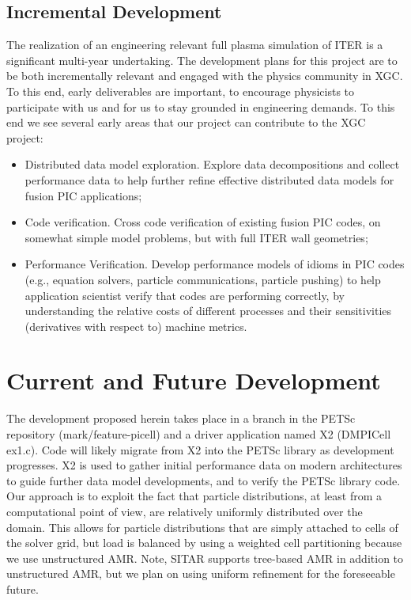\documentclass[review]{siamart}
\begin{document}
\subsection{Incremental Development}
\label{sec:id}

The realization of an engineering relevant full plasma simulation of ITER is a significant multi-year undertaking.
The development plans for this project are to be both incrementally relevant and engaged with the physics community in XGC.
To this end, early deliverables are important, to encourage physicists to participate with us and for us to stay grounded in engineering demands.
To this end we see several early areas that our project can contribute to the XGC project:
\begin{itemize}
\item Distributed data model exploration. Explore data decompositions and collect performance data to help further refine effective distributed data models for fusion PIC applications;
\item Code verification. Cross code verification of existing fusion PIC codes, on somewhat simple model problems, but with full ITER wall geometries;
\item Performance Verification.  Develop performance models of idioms in PIC codes (e.g., equation solvers, particle communications, particle pushing) to help application scientist verify that codes are performing correctly, by understanding the relative costs of different processes and their sensitivities (derivatives with respect to) machine metrics.
\end{itemize}
 

\section{Current and Future Development}
\label{sec:x2}

The development proposed herein takes place in a branch in the PETSc repository (mark/feature-picell) and a driver application named X2 (DMPICell ex1.c).
Code will likely migrate from X2 into the PETSc library as development progresses.
X2 is used to gather initial performance data on modern architectures to guide further data model developments, and to verify the PETSc library code.
Our approach is to exploit the fact that particle distributions, at least from a computational point of view, are relatively uniformly distributed over the domain.
This allows for particle distributions that are simply attached to cells of the solver grid, but load is balanced by using a weighted cell partitioning because we use unstructured AMR.
Note, SITAR supports tree-based AMR in addition to unstructured AMR, but we plan on using uniform refinement for the foreseeable future.
\end{document}
